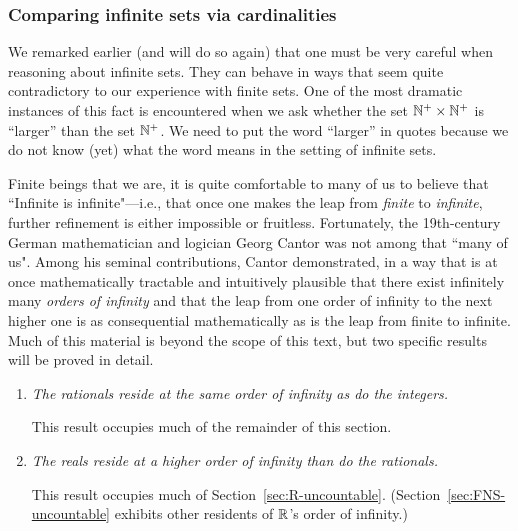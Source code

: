 \subsubsection{Comparing infinite sets via cardinalities}
\label{sec:compare-sets-via-card}

We remarked earlier (and will do so again) that one must be very careful when reasoning about infinite sets.  They can behave in ways that seem quite contradictory to our experience with finite sets.  One of the most dramatic instances of this fact is encountered when we ask whether the set $\mathbb{N}^+ \times \mathbb{N}^+$ is ``larger'' than the set $\mathbb{N}^+$.  We need to put the word ``larger'' in quotes because we do not know (yet) what the word means in the setting of infinite sets.

\smallskip

  

Finite beings that we are, it is quite comfortable to many of us to believe that ``Infinite is infinite"---i.e., that once one makes the leap from {\em finite} to {\em infinite}, further refinement is either impossible or fruitless.  Fortunately, the 19th-century German mathematician and logician Georg Cantor was not among that ``many of us".  Among his seminal contributions, Cantor demonstrated, in a way that is at once mathematically tractable and intuitively plausible that there exist infinitely many {\em orders of infinity} and that the leap from one order of infinity to the next higher one is as consequential mathematically as is the leap from finite to infinite.  Much of this material is beyond the scope of this text, but two specific results will be proved in detail.
\begin{enumerate}
\item
{\em The rationals reside at the same order of infinity as do the integers.}

\smallskip

This result occupies much of the remainder of this section.
\medskip\item
{\em The reals reside at a higher order of infinity than do the rationals.}

\smallskip

This result occupies much of Section~\ref{sec:R-uncountable}.  (Section~\ref{sec:FNS-uncountable} exhibits other residents of $\mathbb{R}$'s order of infinity.)
\end{enumerate}

